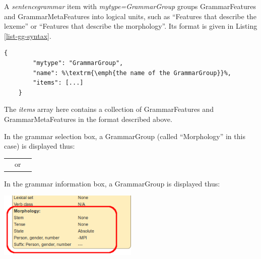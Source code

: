\documentclass[11pt,oneside,a4paper]{memoir}
\begin{document}
A \emph{sentencegrammar} item with \emph{mytype=GrammarGroup} groups GrammarFeatures and
GrammarMetaFeatures into logical units, such as ``Features that describe the lexeme'' or ``Features
that describe the morphology''. Its format is given in Listing \ref{list-gg-syntax}.

\begin{lstlisting}[caption=GrammarGroup syntax,label=list-gg-syntax]
    {
        "mytype": "GrammarGroup",
        "name": %\textrm{\emph{the name of the GrammarGroup}}%,
        "items": [...]
    }
\end{lstlisting}

The \emph{items} array here contains a collection of GrammarFeatures and GrammarMetaFeatures in the
format described above.

\Needspace*{5cm}%
In the grammar selection box, a GrammarGroup (called ``Morphology'' in this case) is displayed thus:

\begin{center}
\begin{tabular}{rcl}
  \vspace{0pt}\parbox{0.3\textwidth}{\includegraphics[width=0.3\textwidth]{morph1a.png}} %
 & or &
  \vspace{0pt}\parbox{0.3\textwidth}{\includegraphics[width=0.3\textwidth]{morph1b.png}}
\end{tabular}
\end{center}

\Needspace*{5cm}%
In the grammar information box, a GrammarGroup is displayed thus:

\begin{center}
  \includegraphics[width=0.5\textwidth]{morph2.png}
\end{center}
\end{document}
